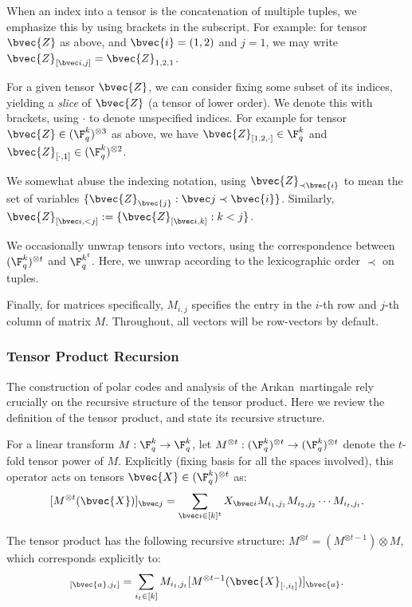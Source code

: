 \documentclass[11pt]{article}
\newcommand{\Arikan}{Ar\i kan}
\begin{document}
When an index into a tensor is the concatenation of multiple tuples, we emphasize this by using brackets in the subscript. For example:
for tensor $\bvec{Z}$ as above, and
$\bvec{i} = (1, 2)$ and $j = 1$, we may write
$\bvec{Z}_{[\bvec i, j]} = \bvec{Z}_{1,2,1}$.

For a given tensor $\bvec{Z}$, we can consider fixing some subset of its indices, yielding a \emph{slice} of $\bvec{Z}$ (a tensor of lower order).
We denote this with brackets, using $\cdot$ to denote unspecified indices.
For example for tensor
$\bvec{Z} \in (\F_q^k)^{\otimes 3}$
as above, we have
$\bvec{Z}_{[1, 2, \cdot]} \in \F_q^k$
and
$\bvec{Z}_{[\cdot, 1]} \in (\F_q^k)^{\otimes 2}$.

We somewhat abuse the indexing notation, using
$\bvec{Z}_{\prec \bvec{i}}$ to mean the set of variables
$\{\bvec{Z}_{\bvec{j}} : \bvec j \prec \bvec{i}\}$.
Similarly,
$\bvec{Z}_{[\bvec i, < j]}
:= \{\bvec{Z}_{[\bvec i, k]} : k < j\}$.

We occasionally unwrap tensors into vectors, using the correspondence between $(\F_q^k)^{\otimes t}$ and $\F_q^{k^t}$.
Here, we unwrap according to the lexicographic order $\prec$ on tuples.

Finally, for matrices specifically, $M_{i, j}$ specifies the entry in the $i$-th row and $j$-th column of matrix $M$.
Throughout, all vectors will be row-vectors by default.


\subsubsection{Tensor Product Recursion}
The construction of polar codes and analysis of the \Arikan\ martingale
rely crucially on the recursive structure of the tensor product.
Here we review the definition of the tensor product, and state its recursive
structure.

For a linear transform $M: \F_q^k \to \F_q^k$,
let
$M^{\otimes t} :
(\F_q^k)^{\otimes t}
\to
(\F_q^k)^{\otimes t}$
denote the $t$-fold tensor power of $M$.
Explicitly (fixing basis for all the spaces involved),
this operator acts on tensors $\bvec{X} \in
(\F_q^k)^{\otimes t}$
as:
$$
[M^{\otimes t}(\bvec{X})]_{\bvec j}
=
\sum_{\bvec i \in [k]^t}X_{\bvec i}
M_{i_1, j_1}
M_{i_2, j_2}
\cdots
M_{i_t, j_t}.
$$


The tensor product has the following recursive structure:
$M^{\otimes t} = (M^{\otimes t-1}) \otimes M$,
which corresponds explicitly to:
\begin{equation}
	[M^{\otimes t}(\bvec{X})]_{[\bvec{a}, j_t]}
	=
	\sum_{i_t\in [k]} M_{i_t, j_t}
	[M^{\otimes t-1}(\bvec{X}_{[\cdot, i_t]})]_{\bvec{a}}.
\end{equation}
\end{document}
